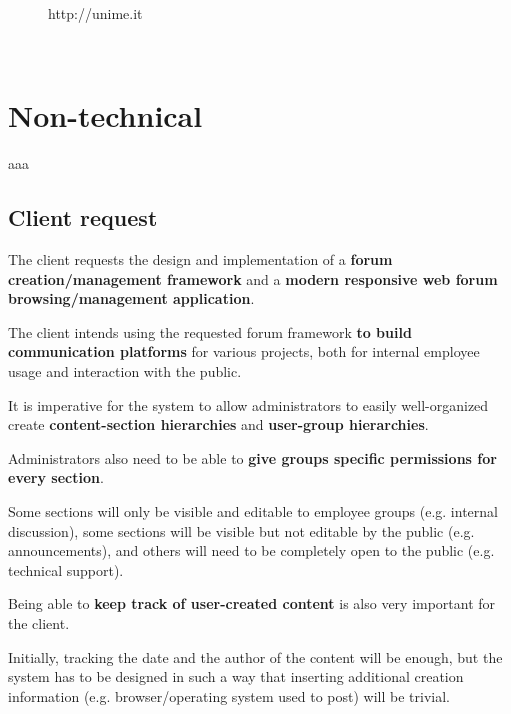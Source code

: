 \documentclass[12pt]{report}
\renewcommand\emph{\textbf}
\begin{document}
\begin{titlepage}
\begin{minipage}{\linewidth}
\begin{minipage}{0.35\linewidth}
\begin{figure}[H]
                    http://unime.it
                \end{figure}
            \end{minipage}
        \end{minipage}\\[3cm]
    \end{titlepage}

    \newcommand{\atoc}[1]{\addtocontents{toc}{#1\par}}
    \renewcommand{\thesection}{\arabic{section}.}
    \tableofcontents
    \newpage

    \part{Non-technical}
        aaa

        \chapter{Client request}
            The client requests the design and implementation of a \emph{forum creation/management framework} and a \emph{modern responsive web forum browsing/management application}.

            The client intends using the requested forum framework \emph{to build communication platforms} for various projects, both for internal employee usage and interaction with the public.

            It is imperative for the system to allow administrators to easily well-organized create \emph{content-section hierarchies} and \emph{user-group hierarchies}.

            Administrators also need to be able to \emph{give groups specific permissions for every section}.

            Some sections will only be visible and editable to employee groups (e.g. internal discussion), some sections will be visible but not editable by the public (e.g. announcements), and others will need to be completely open to the public (e.g. technical support).

            Being able to \emph{keep track of user-created content} is also very important for the client.

            Initially, tracking the date and the author of the content will be enough, but the system has to be designed in such a way that inserting additional creation information (e.g. browser/operating system used to post) will be trivial. 
\end{document}
